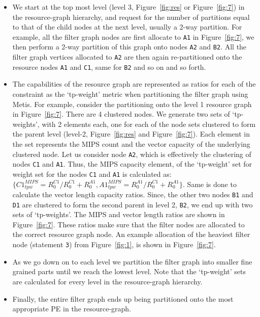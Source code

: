 \begin{itemize}

\item We start at the top most level (level 3, Figure~\ref{fig:res} or
  Figure~\ref{fig:7}) in the resource-graph hierarchy, and request for
  the number of partitions equal to that of the child nodes at the next
  level, usually a 2-way partition. For example, all the filter graph
  nodes are first allocate to \texttt{A1} in Figure~\ref{fig:7}, we then
  perform a 2-way partition of this graph onto nodes \texttt{A2} and
  \texttt{B2}. All the filter graph vertices allocated to \texttt{A2} are
  then again re-partitioned onto the resource nodes \texttt{A1} and
  \texttt{C1}, same for \texttt{B2} and so on and so forth.

\item The capabilities of the resource graph are represented as ratios
  for each of the constraint as the `tp-weight' metric when partitioning
  the filter graph using Metis. For example, consider the partitioning
  onto the level 1 resource graph in Figure~\ref{fig:7}. There are 4
  clustered nodes. We generate two sets of `tp-weights', with 2
  elements each, one for each of the node sets clustered to form the
  parent level (level-2, Figure~\ref{fig:res} and
  Figure~\ref{fig:7}). Each element in the set represents the MIPS count
  and the vector capacity of the underlying clustered node. Let us
  consider node \texttt{A2}, which is effectively the clustering of
  nodes \texttt{C1} and \texttt{A1}. Thus, the MIPS capacity element, of
  the `tp-weight' set for weight set for the nodes \texttt{C1} and
  \texttt{A1} is calculated as: {$\{C1^{MIPS}_{tpw} = R^{C1}_0/R^{C1}_0
    + R^{A1}_0, A1^{MIPS}_{tpw} = R^{A1}_0/R^{C1}_0 + R^{A1}_0\}$}. Same
  is done to calculate the vector length capacity ratios. Since, the
  other two nodes \texttt{B1} and \texttt{D1} are clustered to form the
  second parent in level 2, \texttt{B2}, we end up with two sets of
  `tp-weights'. The MIPS and vector length ratios are shown in
  Figure~\ref{fig:7}. These ratios make sure that the filter nodes are
  allocated to the correct resource graph node. An example allocation of
  the heaviest filter node (statement \texttt{3}) from Figure~\ref{fig:1},
  is shown in Figure~\ref{fig:7}.

\item As we go down on to each level we partition the filter graph into
  smaller fine grained parts until we reach the lowest level. Note that
  the `tp-weight' sets are calculated for every level in the
  resource-graph hierarchy.

\item Finally, the entire filter graph ends up being partitioned onto the
  most appropriate PE in the resource-graph.

\end{itemize}



